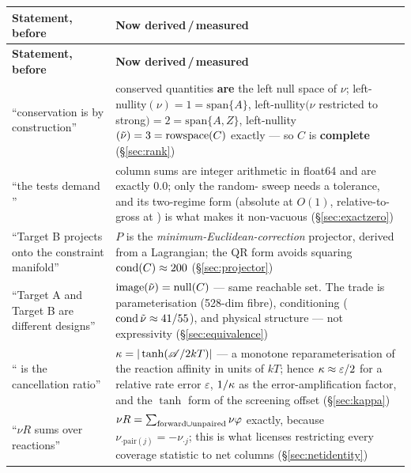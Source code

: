 \begingroup
\footnotesize
\begin{longtable}{@{}L{4.4cm} L{10.6cm}@{}}
\toprule
\textbf{Statement, before} & \textbf{Now derived\,/\,measured} \\
\midrule
\endfirsthead
\toprule
\textbf{Statement, before} & \textbf{Now derived\,/\,measured} \\
\midrule
\endhead
\bottomrule
\endfoot

``conservation is by construction'' &
conserved quantities \textbf{are} the left null space of $\nu$;
left-nullity$(\nu) = 1 = \mathrm{span}\{A\}$, left-nullity$(\nu$ restricted to
strong$) = 2 = \mathrm{span}\{A, Z\}$, left-nullity$(\tilde\nu) = 3 =
\mathrm{rowspace}(C)$ exactly --- so $C$ is \textbf{complete}
(\S\ref{sec:rank}) \\

``the tests demand '' &
column sums are integer arithmetic in float64 and are exactly 0.0; only the
random-\netflux{} sweep needs a tolerance, and its two-regime form (absolute at
$O(1)$, relative-to-gross at ) is what makes it non-vacuous
(\S\ref{sec:exactzero}) \\

``Target B projects onto the constraint manifold'' &
$P$ is the \emph{minimum-Euclidean-correction} projector, derived from a
Lagrangian; the QR form avoids squaring $\operatorname{cond}(C) \approx 200$
(\S\ref{sec:projector}) \\

``Target A and Target B are different designs'' &
\textbf{$\operatorname{image}(\tilde\nu) = \operatorname{null}(C)$} --- same reachable set. The
trade is parameterisation (528-dim fibre), conditioning
($\operatorname{cond}\tilde\nu \approx 41/55$), and physical structure --- not expressivity
(\S\ref{sec:equivalence}) \\

``\kap{} is the cancellation ratio'' &
$\kappa = |\tanh(\mathscr{A}/2kT)|$ --- a monotone reparameterisation of the reaction
affinity in units of $kT$; hence $\kappa \approx \varepsilon/2$ for a relative
rate error $\varepsilon$, $1/\kappa$ as the error-amplification factor, and the
$\tanh$ form of the screening offset (\S\ref{sec:kappa}) \\

``$\nu R$ sums over reactions'' &
$\nu R = \sum_{\rm forward \cup unpaired} \nu\varphi$ exactly, because
$\nu_{\cdot \mathrm{pair}(j)} = -\nu_{\cdot j}$; this is what licenses
restricting every coverage statistic to net columns
(\S\ref{sec:netidentity}) \\


\end{longtable}
